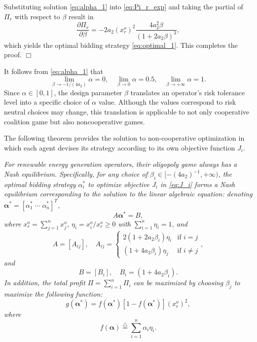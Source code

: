 \documentclass[conference]{IEEEtran}
\begin{document}
Substituting solution \eqref{eq:alpha_1} into 
\eqref{eq:Pi_r_exp} and taking the partial of $\Pi_r$ with respect to $\beta$ result in
\[ \frac{\partial \Pi_r}{\partial \beta} = - 2a_2(x_r^o)^2\frac{4a_2^2\beta}{(1+2a_2\beta)^3}, \]
which yields the optimal bidding strategy \eqref{eq:optimal_1}. This completes the proof. \hfill $\Box$

It follows from \eqref{eq:alpha_1} that
\[ \lim_{\beta\rightarrow-1/(4a_2)} \alpha = 0, \quad  \lim_{\beta\rightarrow0} \alpha = 0.5, \quad \lim_{\beta\rightarrow +\infty} \alpha = 1. \]
Since $\alpha\in[0,1]$, the design parameter $\beta$ translates an operator's risk tolerance level into a specific choice of $\alpha$ value. Although the values correspond to risk neutral choices may change, this translation is applicable to not only cooperative coalition game but also noncooperative games. 

The following theorem provides the solution to non-cooperative optimization in which each agent devises its strategy according to its own objective function $J_i$. 

 {\it For renewable energy generation operators, their oligopoly game always has a Nash equilibrium. Specifically,
for any choice of $\beta_i\in[-(4a_2)^{-1},+\infty)$, the optimal bidding strategy $\alpha_i^*$ to optimize objective $J_i$ in \eqref{eq:J_i} forms a Nash equilibrium corresponding to the solution to the linear algebraic equation:
denoting $\boldsymbol{\alpha}^*=[\alpha_1^* \; \cdots \; \alpha_n^*]^T$,
\begin{equation}
A \boldsymbol{\alpha}^* = B,
\label{eq:alpha_i}
\end{equation}
where $x_r^o = \sum_{j=1}^n x_j^o$, $\eta_i = x_i^o/x_r^o\geq0$ with $\sum_{i=1}^n \eta_i=1$, and
\[ A=[A_{ij}], \quad A_{ij} = \left\{ \begin{array}{ll} 2(1+2a_2\beta_i)\eta_i & \mbox{if $i=j$} \\
(1+4a_2\beta_i)\eta_j & \mbox{if $i\not=j$}\end{array} \right., \]
and
\[ B=[B_i], \quad B_i = (1+4a_2\beta_i). \]
In addition,  the total profit $\Pi=\sum_{i=1}^n\Pi_i$ can be maximized by choosing $\beta_j$ to maximize the following function: 
\begin{equation} 
g(\boldsymbol{\alpha}^*) = f(\boldsymbol{\alpha}^*) \left[ 1 - f(\boldsymbol{\alpha}^*)  \right](x_r^o)^2,
\label{eq:G}
\end{equation} 
where  
\begin{equation} 
f(\boldsymbol{\alpha}) \stackrel{\triangle}{=} \sum_{i=1}^n  \alpha_i \eta_i.  
\label{eq:F}
\end{equation} 
}
\end{document}
